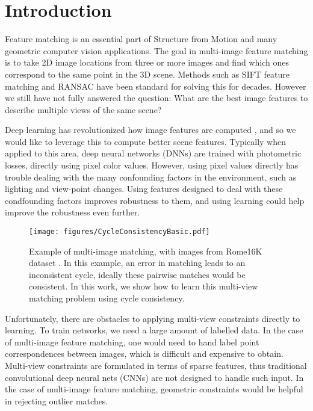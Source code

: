 \documentclass[10pt,twocolumn,letterpaper]{article}
\begin{document}
\section{Introduction}

Feature matching is an essential part of Structure from Motion and many geometric computer vision applications.
The goal in multi-image feature matching is to take 2D image locations from three or more images and find which ones correspond to the same point in the 3D scene.
Methods such as SIFT feature matching \cite{lowe2004distinctive} and RANSAC \cite{fischler1981random} have been standard for solving this for decades.
However we still have not fully answered the question: What are the best image features to describe multiple views of the same scene?

Deep learning has revolutionized how image features are computed \cite{yi2016lift}, and so we would like to leverage this to compute better scene features.
Typically when applied to this area, deep neural networks (DNNs) are trained with photometric losses, directly using pixel color values.
However, using pixel values directly has trouble dealing with the many confounding factors in the environment, such as lighting and view-point changes.
Using features designed to deal with these condfounding factors improves robustness to them, 
and using learning could help improve the robustness even further.

\begin{figure}[t]
\begin{center}
  \texttt{[image: figures/CycleConsistencyBasic.pdf]}
\end{center}
  \caption{
    Example of multi-image matching, with images from Rome16K dataset \cite{li2010location}.
    In this example, an error in matching leads to an inconsistent cycle, ideally these pairwise matches would be consistent.
    In this work, we show how to learn this multi-view matching problem using cycle consistency.
  }
\label{fig:cycconsistex}
\label{fig:onecol}
\end{figure}

Unfortunately, there are obstacles to applying multi-view constraints directly to learning. 
To train networks, we need a large amount of labelled data.
In the case of multi-image feature matching, one would need to hand label point correspondences between images, which is difficult and expensive to obtain.
Multi-view constraints are formulated in terms of sparse features, thus traditional convolutional deep neural nets (CNNs) are not designed to handle such input.
In the case of multi-image feature matching, geometric constraints would be helpful in rejecting outlier matches.
\end{document}
